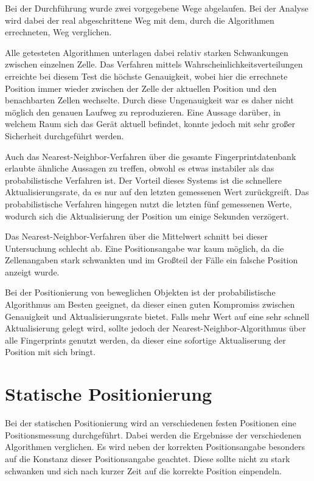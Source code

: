 Bei der Durchführung wurde zwei vorgegebene Wege abgelaufen. Bei der Analyse wird dabei der real abgeschrittene Weg mit dem, durch die Algorithmen errechneten, Weg verglichen.

Alle getesteten Algorithmen unterlagen dabei relativ starken Schwankungen zwischen einzelnen Zelle. Das Verfahren mittels Wahrscheinlichkeitsverteilungen erreichte bei diesem Test die höchste Genauigkeit, wobei hier die errechnete Position immer wieder zwischen der Zelle der aktuellen Position und den benachbarten Zellen wechselte. Durch diese Ungenauigkeit war es daher nicht möglich den genauen Laufweg zu reproduzieren. Eine Aussage darüber, in welchem Raum sich das Gerät aktuell befindet, konnte jedoch mit sehr großer Sicherheit durchgeführt werden.

Auch das Nearest-Neighbor-Verfahren über die gesamte Fingerprintdatenbank erlaubte ähnliche Aussagen zu treffen, obwohl es etwas instabiler als das probabilistische Verfahren ist. Der Vorteil dieses Systems ist die schnellere Aktualisierungsrate, da es nur auf den letzten gemessenen Wert zurückgreift. Das probabilistische Verfahren hingegen nutzt die letzten fünf gemessenen Werte, wodurch sich die Aktualisierung der Position um einige Sekunden verzögert.

Das Nearest-Neighbor-Verfahren über die Mittelwert schnitt bei dieser Untersuchung schlecht ab. Eine Positionsangabe war kaum möglich, da die Zellenangaben stark schwankten und im Großteil der Fälle ein falsche Position anzeigt wurde.


Bei der Positionierung von beweglichen Objekten ist der probabilistische Algorithmus am Besten geeignet, da dieser einen guten Kompromiss zwischen Genauigkeit und Aktualisierungsrate bietet. Falls mehr Wert auf eine sehr schnell Aktualisierung gelegt wird, sollte jedoch der Nearest-Neighbor-Algorithmus über alle Fingerprints genutzt werden, da dieser eine sofortige Aktualiserung der Position mit sich bringt.

\section{Statische Positionierung}
\label{sec:testing:static}

Bei der statischen Positionierung wird an verschiedenen festen Positionen eine Positionsmessung durchgeführt. Dabei werden die Ergebnisse der verschiedenen Algorithmen verglichen. Es wird neben der korrekten Positionsangabe besonders auf die Konstanz dieser Positionsangabe geachtet. Diese sollte nicht zu stark schwanken und sich nach kurzer Zeit auf die korrekte Position einpendeln.

